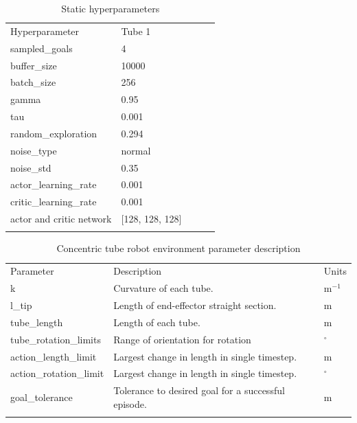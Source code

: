 \begin{table}
\caption{Static hyperparameters}
\label{tab:2} 
\begin{tabular}{lllll}
\hline\noalign{\smallskip}
Hyperparameter  & Tube 1 \\
\noalign{\smallskip}\hline\noalign{\smallskip}
sampled\_goals & 4 \\
buffer\_size & 10000 \\
batch\_size & 256 \\
gamma & 0.95 \\
tau & 0.001 \\
random\_exploration & 0.294 \\
noise\_type & normal \\
noise\_std & 0.35 \\
actor\_learning\_rate & 0.001 \\
critic\_learning\_rate & 0.001 \\
actor and critic network & [128, 128, 128] \\

\noalign{\smallskip}\hline
\end{tabular}
\end{table}

\begin{table}
\caption{Concentric tube robot environment parameter description}
\label{tab:3}       %
\begin{tabular}{lll}
\hline\noalign{\smallskip}
Parameter & Description & Units\\
\noalign{\smallskip}\hline\noalign{\smallskip}
k & Curvature of each tube. & m$^{-1}$ \\
l\_tip & Length of end-effector straight section. & m \\
tube\_length & Length of each tube. & m\\
tube\_rotation\_limits & Range of orientation for rotation & $^\circ$ \\
action\_length\_limit & Largest change in length in single timestep. & m \\
action\_rotation\_limit & Largest change in length in single timestep. & $^\circ$ \\
goal\_tolerance & Tolerance to desired goal for a successful episode. & m \\

\noalign{\smallskip}\hline
\end{tabular}
\end{table}

